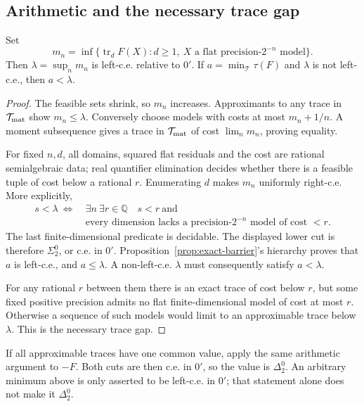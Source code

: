 \subsection{Arithmetic and the necessary trace gap}
\begin{proposition}\label{prop:approximable-arithmetic}
Set
\[
 m_n=\inf\{\operatorname{tr}_d F(X):d\ge1,\ X\text{ a flat precision-}2^{-n}\text{ model}\}.
\]
Then $\lambda=\sup_n m_n$ is left-c.e. relative to $0'$. If $a=\min_{\mathcal T}\tau(F)$ and $\lambda$ is not left-c.e., then $a<\lambda$.
\end{proposition}
\begin{proof}
The feasible sets shrink, so $m_n$ increases. Approximants to any trace in $\mathcal T_{\rm mat}$ show $m_n\le\lambda$. Conversely choose models with costs at most $m_n+1/n$. A moment subsequence gives a trace in $\mathcal T_{\rm mat}$ of cost $\lim_nm_n$, proving equality.

For fixed $n,d$, all domains, squared flat residuals and the cost are rational semialgebraic data; real quantifier elimination decides whether there is a feasible tuple of cost below a rational $r$. Enumerating $d$ makes $m_n$ uniformly right-c.e. More explicitly,
\begin{equation}\label{eq:minimum-lower-cut}
 \begin{split}
 s<\lambda\ \Longleftrightarrow\ &\exists n\ \exists r\in\mathbb Q\quad s<r\ \text{and}\\
 &\text{every dimension lacks a precision-}2^{-n}\text{ model of cost }<r.
 \end{split}
\end{equation}
The last finite-dimensional predicate is decidable. The displayed lower cut is therefore $\Sigma^0_2$, or c.e. in $0'$. Proposition~\ref{prop:exact-barrier}'s hierarchy proves that $a$ is left-c.e., and $a\le\lambda$. A non-left-c.e. $\lambda$ must consequently satisfy $a<\lambda$.

For any rational $r$ between them there is an exact trace of cost below $r$, but some fixed positive precision admits no flat finite-dimensional model of cost at most $r$. Otherwise a sequence of such models would limit to an approximable trace below $\lambda$. This is the necessary trace gap.
\end{proof}

If all approximable traces have one common value, apply the same arithmetic argument to $-F$. Both cuts are then c.e. in $0'$, so the value is $\Delta^0_2$. An arbitrary minimum above is only asserted to be left-c.e. in $0'$; that statement alone does not make it $\Delta^0_2$.

